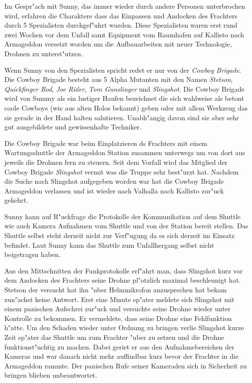 Im Gespr"ach mit Sunny, das immer wieder durch andere Personen unterbrochen wird, erfahren die Charaktere dass das Einpassen und Andocken des Frachters durch 5 Spezialisten durchgef"uhrt wurden. Diese Spezialisten waren erst rund zwei Wochen vor dem Unfall samt Equipment vom  Raumhafen auf Kallisto nach Armageddon versetzt worden um die Aufbauarbeiten mit neuer Technologie, Drohnen zu unterst"utzen.

Wenn Sunny von den Spezialisten spricht redet er nur von der \emph{Cowboy Brigade}. Die Cowboy Brigade besteht aus 5 Alpha Mutanten mit den Namen \emph{Stetson}, \emph{Quickfinger Rod}, \emph{Joe Rider}, \emph{Tom Gunslinger} und \emph{Slingshot}. Die Cowboy Brigade wird von Summy als ein lustiger Haufen bezeichnet die sich wahlweise als betont coole Cowboys (wie aus alten Holos bekannt) geben oder mit allem Werkzeug das sie gerade in der Hand halten salutieren. Unabh"angig davon sind sie aber sehr gut ausgebildete und gewissenhafte Techniker.

Die Cowboy Brigade war beim Einplatzieren ds Frachters mit einem Wartungsshuttle der Armageddon Station zusammen unterwegs um von dort aus jeweils die Drohnen fern zu steuern. Seit dem Vorfall wird das Mitglied der Cowboy Brigade \emph{Slingshot} vermi\3t was die Truppe sehr best"urzt hat. Nachdem die Suche nach Slingshot aufgegeben worden war hat die Cowboy Brigade Armageddon verlassen und ist wieder nach Valhalla nach Kallisto zur"uck gekehrt.

Sunny kann auf R"uckfrage die Protokolle der Kommunikation auf dem Shuttle wie auch Kamera Aufnahmen vom Shuttle und von der Station bereit stellen. Das Shuttle selbst steht derzeit nicht zur Verf"ugung da es sich derzeit im Einsatz befindet. Laut Sunny kann das Shuttle zum Unfallhergang selbst nicht beigetragen haben.

Aus den Mittschnitten der Funkprotokolle erf"ahrt man, dass Slingshot kurz vor dem Andocken des Frachters seine Drohne pl"otzlich maximal beschleunigt hat. Stetson der versucht hat ihn "uber Helmmikrofon anzusprechen hat bekam zun"achst keine Antwort. Erst eine Minute sp"ater meldete sich Slingshot mit einem panischen Aufschrei zur"uck und versuchte seine Drohne wieder unter Kontrolle zu bekommen. Er vermeldete, dass seine Drohne eine Fehlfunktion h"atte. Um den Schaden wieder unter Ordnung zu bringen verlie\3 Slingshot kurze Zeit sp"ater das Shuttle um zum Frachter "uber zu setzen und die Drohne funktionst"uchtig zu machen. Dabei geriet er aus den Aufnahmebereichen der Kameras und war danach nicht mehr auffindbar kurz bevor der Frachter in die Armageddon rammte. Der panischen Rufe seiner Kameraden sich in Sicherheit zu bringen blieben unbeantwortet.


